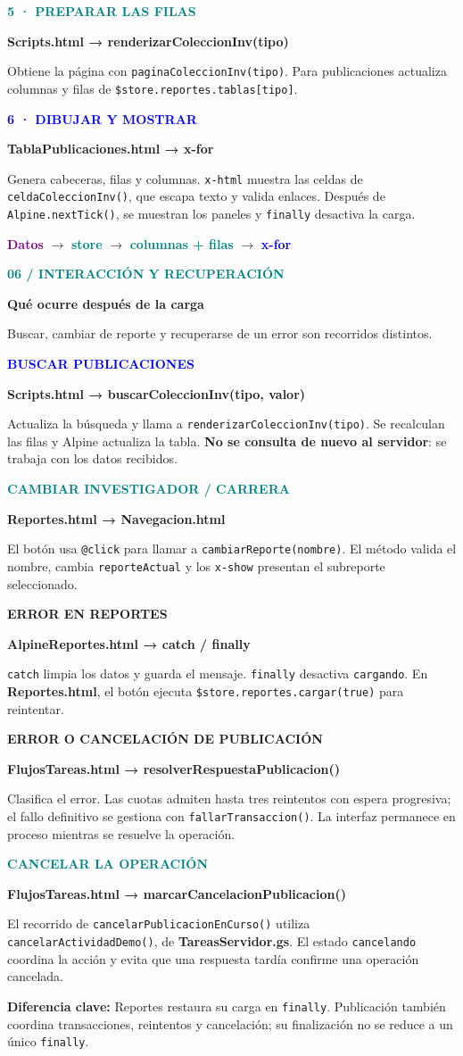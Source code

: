\documentclass[11pt,a4paper]{article}
\newcommand{\titulo}[3]{\textcolor{teal}{\small\textbf{#1}}\par{\LARGE\bfseries #2}\par\vspace{2mm}#3\par\vspace{3mm}}
\newcommand{\paso}[4]{\begin{tcolorbox}[colback=#1!5!white,colframe=#1!40!white,boxrule=0.5pt,arc=2mm,left=3mm,right=3mm,top=2mm,bottom=2mm]\textcolor{#1}{\textbf{#2}}\par\textbf{#3}\par #4\end{tcolorbox}}
\newcommand{\nota}[2]{\begin{tcolorbox}[colback=amber!8!white,colframe=amber!40!white,boxrule=0.5pt,arc=2mm]\textcolor{amber}{\textbf{#1}} #2\end{tcolorbox}}
\newcommand{\archivo}[1]{\textbf{#1}}
\newcommand{\met}[1]{\texttt{#1}}
\begin{document}
\paso{teal}{5 · PREPARAR LAS FILAS}{Scripts.html → renderizarColeccionInv(tipo)}{Obtiene la página con \met{paginaColeccionInv(tipo)}. Para publicaciones actualiza columnas y filas de \met{\$store.reportes.tablas[tipo]}.}
\paso{blue}{6 · DIBUJAR Y MOSTRAR}{TablaPublicaciones.html → x-for}{Genera cabeceras, filas y columnas. \met{x-html} muestra las celdas de \met{celdaColeccionInv()}, que escapa texto y valida enlaces. Después de \met{Alpine.nextTick()}, se muestran los paneles y \met{finally} desactiva la carga.}
\begin{center}\textcolor{purple}{\textbf{Datos}} $\rightarrow$ \textcolor{teal}{\textbf{store}} $\rightarrow$ \textcolor{teal}{\textbf{columnas + filas}} $\rightarrow$ \textcolor{blue}{\textbf{x-for}}\end{center}
\newpage
\titulo{06 / INTERACCIÓN Y RECUPERACIÓN}{Qué ocurre después de la carga}{Buscar, cambiar de reporte y recuperarse de un error son recorridos distintos.}
\paso{blue}{BUSCAR PUBLICACIONES}{Scripts.html → buscarColeccionInv(tipo, valor)}{Actualiza la búsqueda y llama a \met{renderizarColeccionInv(tipo)}. Se recalculan las filas y Alpine actualiza la tabla. \textbf{No se consulta de nuevo al servidor}: se trabaja con los datos recibidos.}
\paso{teal}{CAMBIAR INVESTIGADOR / CARRERA}{Reportes.html → Navegacion.html}{El botón usa \met{@click} para llamar a \met{cambiarReporte(nombre)}. El método valida el nombre, cambia \met{reporteActual} y los \met{x-show} presentan el subreporte seleccionado.}
\paso{amber}{ERROR EN REPORTES}{AlpineReportes.html → catch / finally}{\met{catch} limpia los datos y guarda el mensaje. \met{finally} desactiva \met{cargando}. En \archivo{Reportes.html}, el botón ejecuta \met{\$store.reportes.cargar(true)} para reintentar.}
\paso{amber}{ERROR O CANCELACIÓN DE PUBLICACIÓN}{FlujosTareas.html → resolverRespuestaPublicacion()}{Clasifica el error. Las cuotas admiten hasta tres reintentos con espera progresiva; el fallo definitivo se gestiona con \met{fallarTransaccion()}. La interfaz permanece en proceso mientras se resuelve la operación.}
\paso{teal}{CANCELAR LA OPERACIÓN}{FlujosTareas.html → marcarCancelacionPublicacion()}{El recorrido de \met{cancelarPublicacionEnCurso()} utiliza \met{cancelarActividadDemo()}, de \archivo{TareasServidor.gs}. El estado \met{cancelando} coordina la acción y evita que una respuesta tardía confirme una operación cancelada.}
\nota{Diferencia clave:}{Reportes restaura su carga en \met{finally}. Publicación también coordina transacciones, reintentos y cancelación; su finalización no se reduce a un único \met{finally}.}
\end{document}
